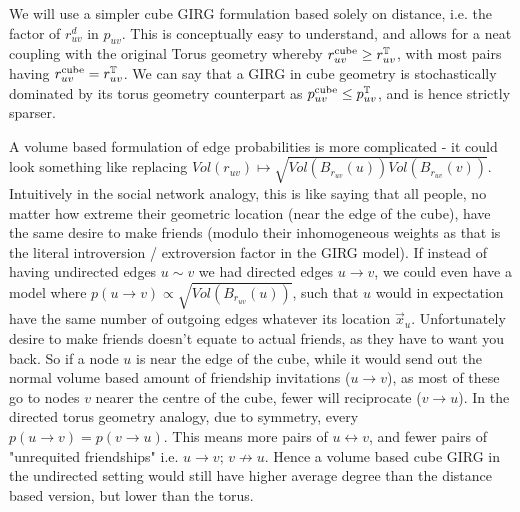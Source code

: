 We will use a simpler cube GIRG formulation based solely on distance, i.e. the factor of $r_{uv}^d$ in $p_{uv}$. This is conceptually easy to understand, and allows for a neat coupling with the original Torus geometry whereby $r_{uv}^\text{cube} \geq r_{uv}^{\mathbb{T}}$, with most pairs having $r_{uv}^\text{cube} = r_{uv}^{\mathbb{T}}$. We can say that a GIRG in cube geometry is stochastically dominated by its torus geometry counterpart as $p_{uv}^\text{cube} \leq p_{uv}^{\mathbb{T}}$, and is hence strictly sparser.

A volume based formulation of edge probabilities is more complicated - it could look something like replacing $Vol(r_{uv}) \mapsto \sqrt{Vol(B_{r_{uv}}(u)) Vol(B_{r_{uv}}(v))}$.
Intuitively in the social network analogy, this is like saying that all people, no matter how extreme their geometric location (near the edge of the cube), have the same desire to make friends (modulo their inhomogeneous weights as that is the literal introversion / extroversion factor in the GIRG model). 
If instead of having undirected edges $u \sim v$ we had directed edges $u \to v$, we could even have a model where $p(u \to v) \propto \sqrt{Vol(B_{r_{uv}}(u))}$, such that $u$ would in expectation have the same number of outgoing edges whatever its location $\vec{x}_u$.
Unfortunately desire to make friends doesn't equate to actual friends, as they have to want you back.
So if a node $u$ is near the edge of the cube, while it would send out the normal volume based amount of friendship invitations ($u \to v$), as most of these go to nodes $v$ nearer the centre of the cube, fewer will reciprocate ($v \to u$). In the directed torus geometry analogy, due to symmetry, every $p(u \to v) = p(v \to u)$. This means more pairs of $u \leftrightarrow v$, and fewer pairs of "unrequited friendships" i.e. $u \to v;\, v \not\to u$.
Hence a volume based cube GIRG in the undirected setting would still have higher average degree than the distance based version, but lower than the torus.


